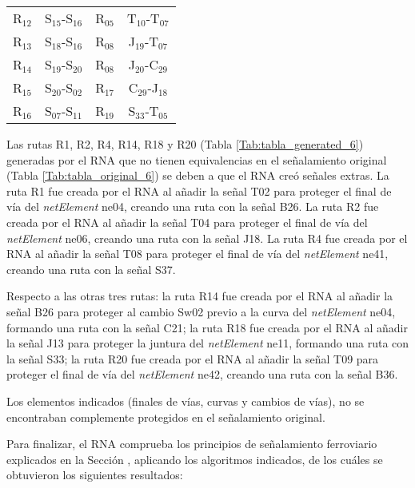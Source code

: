 \begin{table}[H]
{\begin{center}
{\begin{tabular}{ c c c c }
                    R$_{12}$ & S$_{15}$-S$_{16}$ & R$_{05}$ & T$_{10}$-T$_{07}$ \\
                    R$_{13}$ & S$_{18}$-S$_{16}$ & R$_{08}$ & J$_{19}$-T$_{07}$ \\
                    R$_{14}$ & S$_{19}$-S$_{20}$ & R$_{08}$ & J$_{20}$-C$_{29}$ \\
                    R$_{15}$ & S$_{20}$-S$_{02}$ & R$_{17}$ & C$_{29}$-J$_{18}$ \\
                    R$_{16}$ & S$_{07}$-S$_{11}$ & R$_{19}$ & S$_{33}$-T$_{05}$ \\
                \hline
            \end{tabular}
            }
            \end{center}
        }    
    \end{table}
    
    Las rutas R1, R2, R4, R14, R18 y R20 (Tabla \ref{Tab:tabla_generated_6}) generadas por el RNA que no tienen equivalencias en el señalamiento original (Tabla \ref{Tab:tabla_original_6}) se deben a que el RNA creó señales extras. La ruta R1 fue creada por el RNA al añadir la señal T02 para proteger el final de vía del \textit{netElement} ne04, creando una ruta con la señal B26. La ruta R2 fue creada por el RNA al añadir la señal T04 para proteger el final de vía del \textit{netElement} ne06, creando una ruta con la señal J18. La ruta R4 fue creada por el RNA al añadir la señal T08 para proteger el final de vía del \textit{netElement} ne41, creando una ruta con la señal S37.
    
    Respecto a las otras tres rutas: la ruta R14 fue creada por el RNA al añadir la señal B26 para proteger al cambio Sw02 previo a la curva del \textit{netElement} ne04, formando una ruta con la señal C21; la ruta R18 fue creada por el RNA al añadir la señal J13 para proteger la juntura  del \textit{netElement} ne11, formando una ruta con la señal S33; la ruta R20 fue creada por el RNA al añadir la señal T09 para proteger el final de vía del \textit{netElement} ne42, creando una ruta con la señal B36.
    
    Los elementos indicados (finales de vías, curvas y cambios de vías), no se encontraban complemente protegidos en el señalamiento original.
    
    Para finalizar, el RNA comprueba los principios de señalamiento ferroviario explicados en la Sección \label{sec:validar_principios}, aplicando los algoritmos indicados, de los cuáles se obtuvieron los siguientes resultados:
    
